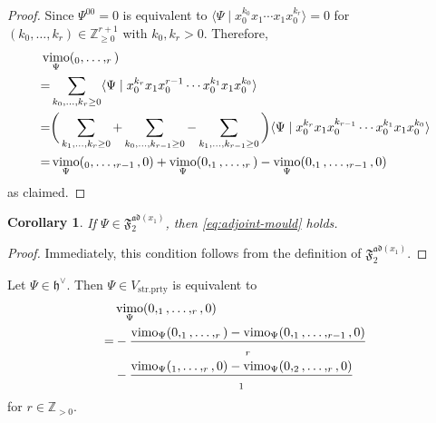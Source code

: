 \documentclass[15pt,oneside,reqno]{amsart}
\newtheorem{cor}[df]{Corollary}
\theoremstyle{remark}{
\newtheorem{lem}[df]{Lemma}
\newtheorem{prop}[df]{Proposition}
\newtheorem{ex}[df]{Example}
\newtheorem{rmk}[df]{Remark}
}
\newcommand{\ide}[1]{\mathfrak{#1}}
\newcommand{\ad}{\mathfrak{ad}}
\newcommand{\Fad}{\mathfrak{F}_2^{\ad(x_1)}}
\DeclareMathOperator{\vimo}{vimo}
\let\x\relax
\newcommand{\x}{\mathrm{x}}
\newcommand{\strprty}{\mathrm{str.prty}}
\begin{document}
\begin{proof}
Since $\Psi^{00} = 0$ is equivalent to $\langle \Psi \mid x_0^{k_0}x_1\cdots x_1x_0^{k_r} \rangle = 0$ for $(k_0,\ldots,k_r) \in \mathbb{Z}_{\ge 0}^{r+1}$ with $k_0,k_r > 0$. Therefore,
\begin{align*}
&\vimo_{\Psi}(\x_0,\ldots,\x_r)\\
&\begin{aligned}
=& \sum_{k_0,\ldots,k_r\ge 0} \langle \Psi \mid x_0^{k_r}x_1x_0^{r-1}\cdots x_0^{k_1}x_1x_0^{k_0}\rangle\\
\end{aligned}\\
&\begin{aligned}
=&\bigg(\sum_{k_1,\ldots,k_r\ge 0} + \sum_{k_0,\ldots,k_{r-1}\ge 0} - \sum_{k_1,\ldots,k_{r-1}\ge 0} \bigg) \langle \Psi \mid x_0^{k_r}x_1x_0^{k_{r-1}}\cdots x_0^{k_1}x_1x_0^{k_0}\rangle\\
\end{aligned}\\
&\begin{aligned}
=&\vimo_{\Psi}(\x_0,\ldots,\x_{r-1},0) + \vimo_{\Psi}(0,\x_1,\ldots,\x_r) - \vimo_{\Psi}(0,\x_1,\ldots,\x_{r-1},0)
\end{aligned}
\end{align*}
as claimed.
\end{proof}

\begin{cor}\label{prop:adjoint-mould}
If $\Psi \in \Fad$, then \eqref{eq:adjoint-mould} holds.
\end{cor}
\begin{proof}
Immediately, this condition follows from the definition of $\Fad$.
\end{proof}


\begin{prop}\label{prop:strong-parity}
Let $\Psi \in \ide{h}^{\vee}$. Then $\Psi \in V_{\strprty}$ is equivalent to
\begin{align}
\begin{aligned}
&\vimo_{\Psi}(0,\x_1,\ldots,\x_r,0)\\
=& -\frac{\vimo_{\Psi }(0,\x_1,\ldots,\x_r) - \vimo_{\Psi }(0,\x_1,\ldots,\x_{r-1},0)}{\x_r} \\
&- \frac{\vimo_{\Psi }(\x_1,\ldots,\x_r,0) - \vimo_{\Psi }(0,\x_2,\ldots,\x_{r},0)}{\x_1}
\end{aligned}
 \label{eq:strong-parity}
\end{align}
for $r\in\mathbb{Z}_{>0}$.
\end{prop}
\end{document}
